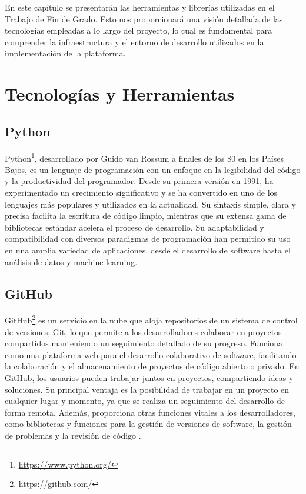\documentclass[a4paper, 12pt]{book}
\begin{document}
En este capítulo se presentarán las herramientas y librerías utilizadas en el Trabajo de Fin de Grado. Esto nos proporcionará una visión detallada de las tecnologías empleadas a lo largo del proyecto, lo cual es fundamental para comprender la infraestructura y el entorno de desarrollo utilizados en la implementación de la plataforma.

\section{Tecnologías y Herramientas}
\label{sec:tecnologias y herramientas}

\subsection{Python} 
\label{subsec:Python} 
Python\footnote{\url{https://www.python.org/}}, desarrollado por Guido van Rossum a finales de los 80 en los Países Bajos, es un lenguaje 
de programación con un enfoque en la legibilidad del código y la productividad del programador. Desde su primera versión en 1991, ha 
experimentado un crecimiento significativo y se ha convertido en uno de los lenguajes más populares y utilizados en la actualidad. Su sintaxis simple, 
clara y precisa facilita la escritura de código limpio, mientras que su extensa gama de bibliotecas estándar acelera el proceso de desarrollo. 
Su adaptabilidad y compatibilidad con diversos paradigmas de programación han permitido su uso en una amplia variedad de aplicaciones, desde el 
desarrollo de software hasta el análisis de datos y machine learning.

\subsection{GitHub} 
\label{subsec:github} 
GitHub\footnote{\url{https://github.com/}} es un servicio en la nube que aloja repositorios de un sistema de control de versiones, Git, lo que permite a los 
desarrolladores colaborar en proyectos compartidos manteniendo un seguimiento detallado de su progreso. Funciona como una plataforma web para el 
desarrollo colaborativo de software, facilitando la colaboración y el almacenamiento de proyectos de código abierto o privado. En GitHub, los usuarios 
pueden trabajar juntos en proyectos, compartiendo ideas y soluciones. Su principal ventaja es la posibilidad de trabajar en un proyecto en cualquier 
lugar y momento, ya que se realiza un seguimiento del desarrollo de forma remota. Además, proporciona otras funciones vitales a los desarrolladores, 
como bibliotecas y funciones para la gestión de versiones de software, la gestión de problemas y la revisión de código \cite{tfg-karol}.
\end{document}
